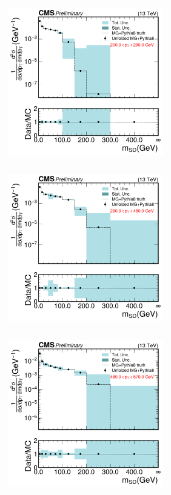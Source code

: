       \begin{figure}[htp!]
        \begin{subfigure}
          \centering
          \includegraphics[width=0.45\textwidth]{figures/multijet/unfolding/dijet/closure_binnedResult_groomed_0.pdf}
        \end{subfigure} 
        \begin{subfigure}
          \centering
          \includegraphics[width=0.45\textwidth]{figures/multijet/unfolding/dijet/closure_binnedResult_groomed_1.pdf}
        \end{subfigure}
        \begin{subfigure}
          \centering
          \includegraphics[width=0.45\textwidth]{figures/multijet/unfolding/dijet/closure_binnedResult_groomed_2.pdf}
        \end{subfigure} 
        \begin{subfigure}

\end{subfigure}
\end{figure}

